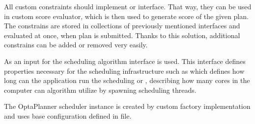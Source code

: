 All custom constraints should implement  
or  interface.
That way, 
they can be used in custom score evaluator,
which is then used to generate score of the given plan.
The constrains are stored in collections of previously mentioned interfaces 
and evaluated at once, when plan is submitted.
Thanks to this solution,
additional constrains can be added or removed very easily.

As an input for the scheduling algorithm interface  is used.
This interface defines properties necessary for the scheduling infrastructure
such as  which defines how long can the application run the scheduling 
or , describing how many cores in the computer can algorithm utilize by spawning scheduling threads.

The OptaPlanner scheduler instance is created by custom factory implementation 
 and uses base configuration defined in  file.

